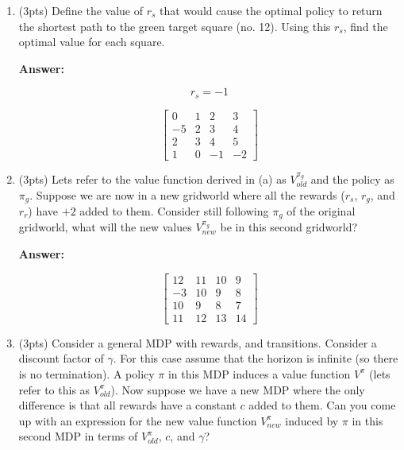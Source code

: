 \begin{enumerate}[label=(\alph*)]
\item (3pts) Define the value of $r_s$ that would cause the optimal policy to return the shortest path to the green target square (no. 12). Using this $r_s$, find the optimal value for each square.

\textbf{Answer:}

\begin{equation}
r_s = -1
\end{equation}

\begin{equation}
\begin{bmatrix}
0 & 1 & 2 & 3 \\
-5& 2 & 3 & 4 \\
2 & 3 & 4 & 5 \\
1 & 0& -1& -2
\end{bmatrix}
\end{equation}

\item (3pts) Lets refer to the value function derived in (a) as $V^{\pi_g}_{old}$ and the policy as $\pi_g$. Suppose we are now in a new gridworld where all the rewards ($r_s$, $r_g$, and $r_r$) have $+2$ added to them. Consider still following $\pi_g$ of the original gridworld, what will the new values $V^{\pi_g}_{new}$ be in this second gridworld?

\textbf{Answer:}

\begin{equation}
\begin{bmatrix}
12 & 11 & 10 & 9 \\
-3 & 10 & 9  & 8 \\
10 & 9  & 8  & 7 \\
11 & 12 & 13 & 14
\end{bmatrix}
\end{equation}

\item (3pts) Consider a general MDP with rewards, and transitions. Consider a discount factor of $\gamma$. For this case assume that the horizon is infinite (so there is no termination). A policy $\pi$ in this MDP induces a value function $V^\pi$ (lets refer to this as $V^\pi_{old}$). Now suppose we have a new MDP where the only difference is that all rewards have a constant $c$ added to them. Can you come up with an expression for the new value function $V^\pi_{new}$ induced by $\pi$ in this second MDP in terms of $V^\pi_{old}$, $c$, and $\gamma$?


\end{enumerate}
